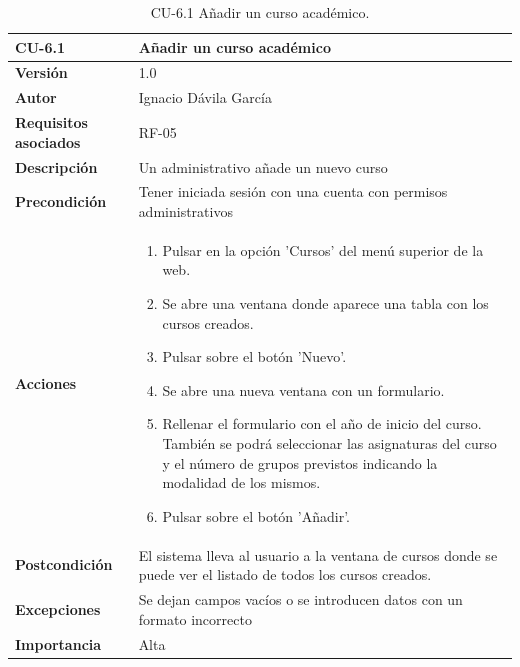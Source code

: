 \begin{table}[p]
	\centering
	\begin{tabularx}{\linewidth}{ p{} p{} }
		\toprule
		\textbf{CU-6.1}    & \textbf{Añadir un curso académico}\\
		\toprule
		\textbf{Versión}              & 1.0    \\
		\textbf{Autor}                & Ignacio Dávila García \\
		\textbf{Requisitos asociados} & RF-05 \\
		\textbf{Descripción}          & Un administrativo añade un nuevo curso \\
		\textbf{Precondición}         & Tener iniciada sesión con una cuenta con permisos administrativos \\
		\textbf{Acciones}             &
		\begin{enumerate}
			\def\labelenumi{\arabic{enumi}.}
			\tightlist
			\item Pulsar en la opción 'Cursos' del menú superior de la web.
			\item Se abre una ventana donde aparece una tabla con los cursos creados.
			\item Pulsar sobre el botón 'Nuevo'.
			\item Se abre una nueva ventana con un formulario.
			\item Rellenar el formulario con el año de inicio del curso. También se podrá seleccionar las asignaturas del curso y el número de grupos previstos indicando la modalidad de los mismos.
			\item Pulsar sobre el botón 'Añadir'.
		\end{enumerate}\\
		\textbf{Postcondición}        & El sistema lleva al usuario a la ventana de cursos donde se puede ver el listado de todos los cursos creados. \\
		\textbf{Excepciones}          & Se dejan campos vacíos o se introducen datos con un formato incorrecto \\
		\textbf{Importancia}          & Alta \\
		\bottomrule
	\end{tabularx}
	\caption{CU-6.1 Añadir un curso académico.}
\end{table}

